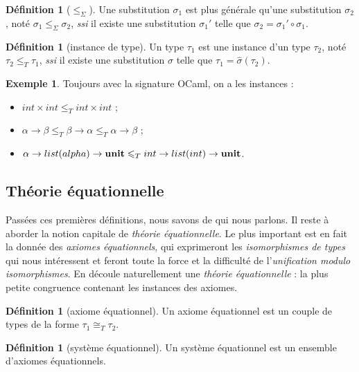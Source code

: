 \documentclass[a4paper]{report}
\theoremstyle{definition}
\newtheorem{definition}[theoreme]{Définition}
\newtheorem{exemple}[theoreme]{Exemple}
\newcommand{\ssi}{\textit{ssi}\xspace}
\newcommand{\unit}{\bold{unit}}
\newcommand{\Tleq}{\leqslant_T}
\newcommand{\Tiso}{\cong_T}
\begin{document}
\begin{definition}[$\leqslant_\Sigma$]
	Une substitution $\sigma_1$ est plus générale qu'une substitution $\sigma_2$, noté $\sigma_1 \leqslant_\Sigma \sigma_2$, \ssi il existe une substitution $\sigma_1'$ telle que $\sigma_2 = \sigma_1' \circ \sigma_1$.
\end{definition}

\begin{definition}[instance de type]
	Un type $\tau_1$ est une instance d'un type $\tau_2$, noté $\tau_2 \Tleq \tau_1$, \ssi il existe une substitution $\sigma$ telle que $\tau_1 = \hat \sigma (\tau_2)$.
\end{definition}

\begin{exemple}
	Toujours avec la signature OCaml, on a les instances :
	\begin{itemize}
		\item $int \times int \leqslant_T int \times int$ ;
		\item $\alpha \rightarrow \beta \leqslant_T \beta \rightarrow \alpha \leqslant_T \alpha \rightarrow \beta$ ;
		\item $\alpha \rightarrow list (alpha) \rightarrow \unit \leqslant_T int \rightarrow list (int) \rightarrow \unit$.
	\end{itemize}
\end{exemple}


\subsection{Théorie équationnelle}

Passées ces premières définitions, nous savons de qui nous parlons. Il reste à aborder la notion capitale de \emph{théorie équationnelle}. Le plus important est en fait la donnée des \emph{axiomes équationnels}, qui exprimeront les \emph{isomorphismes de types} qui nous intéressent et feront toute la force et la difficulté de l'\emph{unification modulo isomorphismes}. En découle naturellement une \emph{théorie équationnelle} : la plus petite congruence contenant les instances des axiomes.

\begin{definition}[axiome équationnel]
	Un axiome équationnel est un couple de types de la forme $\tau_1 \Tiso \tau_2$.
\end{definition}

\begin{definition}[système équationnel]
	Un système équationnel est un ensemble d'axiomes équationnels.
\end{definition}
\end{document}
